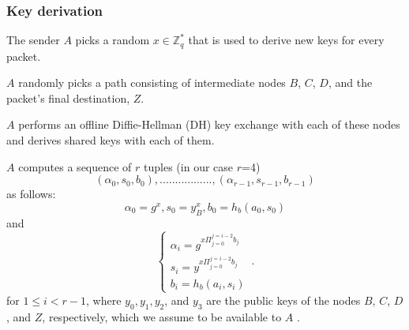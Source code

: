 \subsubsection{Key derivation}
\label{sec:sphinx:keyderivation}

The sender $A$ picks a random $x\in \mathbb{Z}^*_q$ that is used to derive new keys for every packet.

$A$ randomly picks a path consisting of intermediate nodes $B$, $C$, $D$, and the packet's final destination, $Z$.

$A$ performs an offline Diffie-Hellman (DH) key exchange with each of these nodes and derives shared keys with each of them.

$A$ computes a sequence of $r$ tuples (in our case $r$=4)  $$(\alpha_0,s_0,b_0),.................,(\alpha_{r-1},s_{r-1},b_{r-1})$$ as follows:
$$\alpha_0=g^x,s_0=y^x_B,b_0=h_b(a_0,s_0)$$
and
\begin{equation}
    \begin{cases}
        \alpha_i=g^{x\Pi_{j=0}^{j=i-2}b_j} \\
        s_i=y^{x\Pi_{j=0}^{j=i-2}b_j}      \\
        b_i=h_b(a_i,s_i)
    \end{cases}\,.
    \label{eq:1}
\end{equation}
for $1\le i < r-1$, where $y_0, y_1, y_2$, and $y_3$ are the public keys of the nodes $B$, $C$, $D$, and $Z$, respectively, which we assume to be available to $A$ .